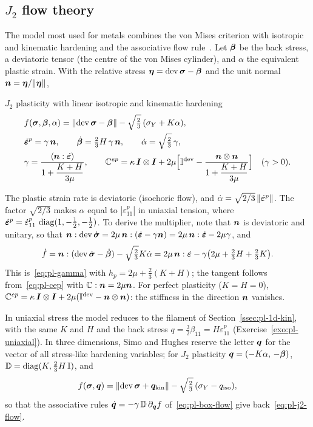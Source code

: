 \subsection{\texorpdfstring{$J_2$}{J2} flow theory}\label{ssec:pl-j2}
%
The model most used for metals combines the von Mises criterion with
isotropic and kinematic hardening and the associative flow
rule~\cite[Sec.~2.3.2]{SimoHughes1998}. Let $\bm{\beta}$ be the back stress, a
deviatoric tensor (the centre of the von Mises cylinder), and $\alpha$ the
equivalent plastic strain. With the relative stress $\bm{\eta}=\operatorname{dev}\bm{\sigma}-\bm{\beta}$
and the unit normal $\bm{n}=\bm{\eta}/\lVert \bm{\eta}\rVert$,
\begin{gbox}{$J_2$ plasticity with linear isotropic and kinematic hardening}
\begin{align}
  &f(\bm{\sigma},\bm{\beta},\alpha)=\lVert \operatorname{dev}\bm{\sigma}-\bm{\beta}\rVert-\sqrt{\tfrac23}\,(\sigma_{Y}+K\alpha),\label{eq:pl-j2-f}\\
  &\dot{\bm{\varepsilon}}^p=\gamma\,\bm{n},\qquad
  \dot{\bm{\beta}}=\tfrac23H\,\gamma\,\bm{n},\qquad
  \dot\alpha=\sqrt{\tfrac23}\,\gamma ,\label{eq:pl-j2-flow}\\
  &\gamma=\frac{\langle \bm{n}:\dot{\bm{\varepsilon}}\rangle}{1+\dfrac{K+H}{3\mu}},\qquad
  \mathbb{C}^{ep}=\kappa\,\bm{I}\otimes\bm{I}+2\mu\Bigl[\mathbb{I}^{\mathrm{dev}}-\frac{\bm{n}\otimes\bm{n}}{1+\dfrac{K+H}{3\mu}}\Bigr]
  \quad(\gamma>0).\label{eq:pl-j2-cep}
\end{align}
\end{gbox}
\noindent The plastic strain rate is deviatoric (isochoric flow), and
$\dot\alpha=\sqrt{2/3}\,\lVert \dot{\bm{\varepsilon}}^p\rVert$. The factor $\sqrt{2/3}$ makes $\alpha$
equal to $|\varepsilon^p_{11}|$ in uniaxial tension, where
$\dot{\bm{\varepsilon}}^p=\dot\varepsilon^p_{11}\,\operatorname{diag}(1,-\tfrac12,-\tfrac12)$. To derive
the multiplier, note that $\bm{n}$ is deviatoric and unitary, so that
$\bm{n}:\operatorname{dev}\dot{\bm{\sigma}}=2\mu\,\bm{n}:(\dot{\bm{\varepsilon}}-\gamma\bm{n})=2\mu\,\bm{n}:\dot{\bm{\varepsilon}}-2\mu\gamma$, and
\[
  \dot f=\bm{n}:(\operatorname{dev}\dot{\bm{\sigma}}-\dot{\bm{\beta}})-\sqrt{\tfrac23}K\dot\alpha
  =2\mu\,\bm{n}:\dot{\bm{\varepsilon}}-\gamma\bigl(2\mu+\tfrac23H+\tfrac23K\bigr).
\]
This is~\eqref{eq:pl-gamma} with $h_p=2\mu+\tfrac23(K+H)$; the tangent follows
from~\eqref{eq:pl-cep} with $\mathbb{C}:\bm{n}=2\mu\bm{n}$. For perfect plasticity
($K=H=0$), $\mathbb{C}^{ep}=\kappa\,\bm{I}\otimes\bm{I}+2\mu(\mathbb{I}^{\mathrm{dev}}-\bm{n}\otimes\bm{n})$: the
stiffness in the direction $\bm{n}$ vanishes.

In uniaxial stress the model reduces to the filament of
Section~\ref{ssec:pl-1d-kin}, with the same $K$ and $H$ and the back stress
$q=\tfrac32\beta_{11}=H\varepsilon^p_{11}$ (Exercise~\ref{exo:pl-uniaxial}).
In three dimensions, Simo and Hughes reserve the letter $\bm{q}$ for the vector of
all stress-like hardening variables; for $J_2$ plasticity
$\bm{q}=(-K\alpha,\,-\bm{\beta})$, $\mathbb{D}=\operatorname{diag}(K,\tfrac23H\,\mathbb{I})$, and
\[
  f(\bm{\sigma},\bm{q})=\lVert \operatorname{dev}\bm{\sigma}+\bm{q}_{\mathrm{kin}}\rVert-\sqrt{\tfrac23}\,(\sigma_{Y}-q_{\mathrm{iso}}),
\]
so that the associative rules $\dot{\bm{q}}=-\gamma\,\mathbb{D}\,\partial_{\bm{q}}f$
of~\eqref{eq:pl-box-flow} give back~\eqref{eq:pl-j2-flow}.

